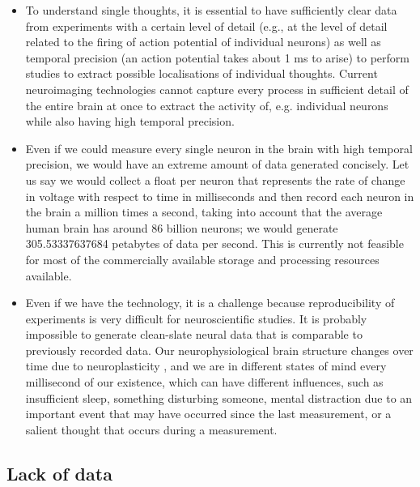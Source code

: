 \begin{itemize}
  \item To understand single thoughts, it is essential to have sufficiently clear data from experiments with a certain level of detail (e.g., at the level of detail related to the firing of action potential of individual neurons) as well as temporal precision (an action potential takes about 1 ms to arise) to perform studies to extract possible localisations of individual thoughts. Current neuroimaging technologies cannot capture every process in sufficient detail of the entire brain at once to extract the activity of, e.g. individual neurons while also having high temporal precision.
  \item Even if we could measure every single neuron in the brain with high temporal precision, we would have an extreme amount of data generated concisely. Let us say we would collect a float per neuron that represents the rate of change in voltage with respect to time in milliseconds and then record each neuron in the brain a million times a second, taking into account that the average human brain has around 86 billion neurons; we would generate 305.53337637684 petabytes of data per second. This is currently not feasible for most of the commercially available storage and processing resources available.
  \item Even if we have the technology, it is a challenge because reproducibility of experiments is very difficult for neuroscientific studies. It is probably impossible to generate clean-slate neural data that is comparable to previously recorded data. Our neurophysiological brain structure changes over time due to neuroplasticity \citep{puderbaugh_neuroplasticity_2022}, and we are in different states of mind every millisecond of our existence, which can have different influences, such as insufficient sleep, something disturbing someone, mental distraction due to an important event that may have occurred since the last measurement, or a salient thought that occurs during a measurement.
\end{itemize}

\subsection{Lack of data}
\label{chapter2-lack-of-data}


